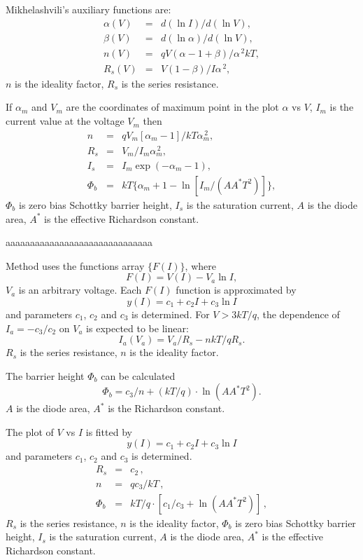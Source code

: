 \documentclass[14pt]{article}
\numberwithin{equation}{part}
\begin{document}
Mikhelashvili's auxiliary functions are:
\begin{eqnarray*}
\alpha(V)&=&d(\ln I)/d(\ln V),\\
\beta(V)&=&d(\ln \alpha)/d(\ln V),\\
n(V)&=&qV(\alpha-1+\beta)/\alpha^{\,2} kT,\\
R_s(V)&=&V(1-\beta)/I\alpha^{\,2},
\end{eqnarray*}
$n$ is the ideality factor, $R_s$ is the series resistance.

If $\alpha_{m}$ and $V_{m}$ are the coordinates of maximum point in the plot $\alpha$ vs $V$,
$I_{m}$ is the current value at the voltage $V_{m}$ then
\begin{eqnarray*}
n&=&qV_m[\alpha_{m}-1]/kT\alpha_{m}^{\,2},\\
R_s&=&V_m/I_m\alpha_{m}^{\,2},\\
I_s&=&I_m\exp(-\alpha_{m}-1),\\
\Phi_b&=&kT\{\alpha_{m}+1-\ln[I_m/(AA^*T^2)]\},
\end{eqnarray*}
$\Phi_b$ is zero bias Schottky barrier height,
$I_s$ is the saturation current,
$A$ is the diode area,
$A^*$ is the effective Richardson constant.

\vspace{5mm}
aaaaaaaaaaaaaaaaaaaaaaaaaaaaaa
\vspace{5mm}

Method uses the functions array $\{F(I)\}$, where
\begin{equation*}
F(I)=V(I)-V_a\ln I,
\end{equation*}
$V_a$ is an arbitrary voltage.
Each $F(I)$ function is approximated by
\begin{equation*}
y(I)=c_1+c_2I+c_3\ln I
\end{equation*}
and parameters $c_1$, $c_2$ and $c_3$ is determined.
For $V>3kT/q$, the dependence of $I_a=-c_3/c_2$ on $V_a$ is expected to be linear:
\begin{equation*}
I_a(V_a)=V_a/R_s-nkT/qR_s.
\end{equation*}
$R_s$ is the series resistance,
$n$ is the ideality factor.

The barrier height $\Phi_b$ can be calculated
\begin{equation*}
\Phi_b=c_3/n+(kT/q)\cdot\ln\left(AA^*T^2\right).
\end{equation*}
$A$ is the diode area,
$A^*$ is the Richardson constant.

\pagebreak

The plot of $V$ vs $I$ is fitted by
\begin{equation*}
y(I)=c_1+c_2I+c_3\ln I
\end{equation*}
and parameters $c_1$, $c_2$ and $c_3$ is determined.
\begin{eqnarray*}
\label{eqGr1}
R_s&=&c_2\,,
\\
n&=&qc_3/kT\,,
\\
\Phi_b&=&kT/q\cdot\left[c_1/c_3+\ln\left(AA^*T^2\right)\right]\,,
\end{eqnarray*}
$R_s$ is the series resistance,
$n$ is the ideality factor,
$\Phi_b$ is zero bias Schottky barrier height,
$I_s$ is the saturation current,
$A$ is the diode area,
$A^*$ is the effective Richardson constant.
\end{document}

